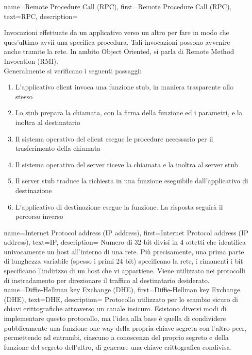 {
    name={Remote Procedure Call (RPC)},
    first={Remote Procedure Call (RPC)},
    text={RPC},
    description={
            Invocazioni effettuate da un applicativo verso un altro per fare in modo che ques'ultimo avvii
            una specifica procedura.
            Tali invocazioni possono avvenire anche tramite la rete.
            In ambito Object Oriented, si parla di Remote Method Invocation (RMI). \\
            Generalmente si verificano i seguenti passaggi:
            \begin{enumerate}
                \item L'applicativo client invoca una funzione stub, in maniera trasparente allo stesso
                \item Lo stub prepara la chiamata, con la firma della funzione ed i parametri, e la inoltra al destinatario
                \item Il sistema operativo del client esegue le procedure necessario per il trasferimento della chiamata
                \item Il sistema operativo del server riceve la chiamata e la inoltra al server stub
                \item Il server stub traduce la richiesta in una funzione eseguibile dall'applicativo di destinazione
                \item L'applicativo di destinazione esegue la funzione. La risposta seguirà il percorso inverso
            \end{enumerate}
        }
}
{
    name={Internet Protocol address (IP address)},
    first={Internet Protocol address (IP address)},
    text={IP},
    description={
            Numero di 32 bit divisi in 4 ottetti che identifica univocamente un host all'interno di una rete.
            Più precisamente, una prima parte di lunghezza variabile (spesso i primi 24 bit) specificano la rete,
            i rimanenti i bit specificano l'indirizzo di un host che vi appartiene.
            Viene utilizzato nei protocolli di instradamento per direzionare il traffico al destinatario desiderato.
        }
}
{
    name={Diffie-Hellman key Exchange (DHE)},
    first={Diffie-Hellman key Exchange (DHE)},
    text={DHE},
    description={
            Protocollo utilizzato per lo scambio sicuro di chiavi crittografiche attraverso un canale insicuro.
            Esistono diversi modi di implementare questo protocollo, ma l'idea alla base è quella di condividere
            pubblicamente una funzione one-way della propria chiave segreta con l'altro peer, permettendo ad entrambi,
            ciascuno a conoscenza del proprio segreto e della funzione del segreto dell'altro, di generare una chiave crittografica condivisa.
        }
}
